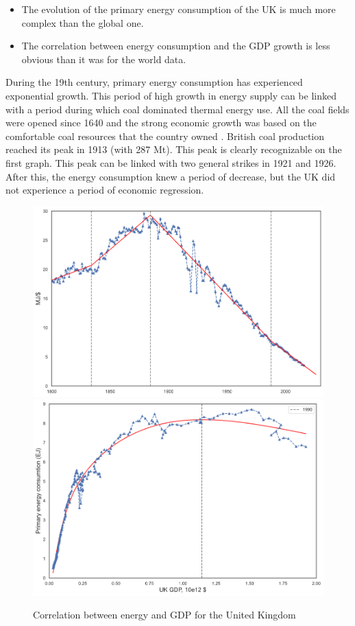 \documentclass[conference]{IEEEtran}
\begin{document}
\begin{itemize}
    \item The evolution of the primary energy consumption of the UK is much more complex than the global one.
    \item The correlation between energy consumption and the GDP growth is less obvious than it was for the world data.
\end{itemize}
During the 19th century, primary energy consumption has experienced exponential growth. This period of high growth in energy supply can be linked with a period during which coal dominated thermal energy use. All the coal fields were opened since 1640 and the strong economic growth was based on the comfortable coal resources that the country owned \cite{smil_energy_2010}. 
British coal production reached its peak in 1913 (with 287 Mt). This peak is clearly recognizable on the first graph. This peak can be linked with two general strikes in 1921 and 1926. After this, the energy consumption knew a period of decrease, but the UK did not experience a period of economic regression. 
\\
\begin{figure}
    \centering
    \includegraphics[scale=0.22]{energy-eff-gbr.png}
    \includegraphics[scale=0.22]{energyintensity-GBR.png}
    \caption{Correlation between energy and GDP for the United Kingdom}
    \label{GBRcorrel}
\end{figure}
\end{document}
